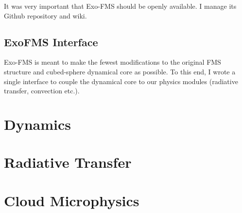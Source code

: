 It was very important that Exo-FMS should be openly available. I manage its Github repository and wiki.


\subsection*{ExoFMS Interface}

Exo-FMS is meant to make the fewest modifications to the original FMS structure and cubed-sphere dynamical core as possible. To this end, I wrote a single interface to couple the dynamical core to our physics modules (radiative transfer, convection etc.).



\section{Dynamics}





\section{Radiative Transfer}





\section{Cloud Microphysics}










